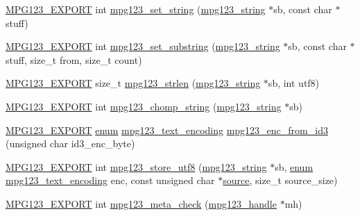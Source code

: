 \begin{DoxyCompactItemize}
\item 
\hyperlink{mpg123_8h_a2ba98cfba3f760879df70e755b2a61cc}{M\+P\+G123\+\_\+\+E\+X\+P\+O\+RT} int \hyperlink{group__mpg123__metadata_ga96e9070d26d63c02c3f22caa0d339f26}{mpg123\+\_\+set\+\_\+string} (\hyperlink{structmpg123__string}{mpg123\+\_\+string} $\ast$sb, const char $\ast$stuff)
\item 
\hyperlink{mpg123_8h_a2ba98cfba3f760879df70e755b2a61cc}{M\+P\+G123\+\_\+\+E\+X\+P\+O\+RT} int \hyperlink{group__mpg123__metadata_ga37b68d834755647a4ef227b0dd4b5c2a}{mpg123\+\_\+set\+\_\+substring} (\hyperlink{structmpg123__string}{mpg123\+\_\+string} $\ast$sb, const char $\ast$stuff, size\+\_\+t from, size\+\_\+t count)
\item 
\hyperlink{mpg123_8h_a2ba98cfba3f760879df70e755b2a61cc}{M\+P\+G123\+\_\+\+E\+X\+P\+O\+RT} size\+\_\+t \hyperlink{group__mpg123__metadata_ga556c8eb6c2ee4b88d744dcf20dffa83b}{mpg123\+\_\+strlen} (\hyperlink{structmpg123__string}{mpg123\+\_\+string} $\ast$sb, int utf8)
\item 
\hyperlink{mpg123_8h_a2ba98cfba3f760879df70e755b2a61cc}{M\+P\+G123\+\_\+\+E\+X\+P\+O\+RT} int \hyperlink{group__mpg123__metadata_gad149639f724347c8c420c8551ea3d4c2}{mpg123\+\_\+chomp\+\_\+string} (\hyperlink{structmpg123__string}{mpg123\+\_\+string} $\ast$sb)
\item 
\hyperlink{mpg123_8h_a2ba98cfba3f760879df70e755b2a61cc}{M\+P\+G123\+\_\+\+E\+X\+P\+O\+RT} \hyperlink{interfaceenum}{enum} \hyperlink{group__mpg123__metadata_ga489b4cd5fb8d1d826e38b09bed9294ce}{mpg123\+\_\+text\+\_\+encoding} \hyperlink{group__mpg123__metadata_gabd394947d8cca46e49a0e07926bb2369}{mpg123\+\_\+enc\+\_\+from\+\_\+id3} (unsigned char id3\+\_\+enc\+\_\+byte)
\item 
\hyperlink{mpg123_8h_a2ba98cfba3f760879df70e755b2a61cc}{M\+P\+G123\+\_\+\+E\+X\+P\+O\+RT} int \hyperlink{group__mpg123__metadata_ga5800cb8b5886969982a695258d80f342}{mpg123\+\_\+store\+\_\+utf8} (\hyperlink{structmpg123__string}{mpg123\+\_\+string} $\ast$sb, \hyperlink{interfaceenum}{enum} \hyperlink{group__mpg123__metadata_ga489b4cd5fb8d1d826e38b09bed9294ce}{mpg123\+\_\+text\+\_\+encoding} enc, const unsigned char $\ast$\hyperlink{structsource}{source}, size\+\_\+t source\+\_\+size)
\item 
\hyperlink{mpg123_8h_a2ba98cfba3f760879df70e755b2a61cc}{M\+P\+G123\+\_\+\+E\+X\+P\+O\+RT} int \hyperlink{group__mpg123__metadata_ga1cd6279a1273f63eb8dcc8a554d815bb}{mpg123\+\_\+meta\+\_\+check} (\hyperlink{group__mpg123__init_ga6728e2839a395f3a07d4514da659faca}{mpg123\+\_\+handle} $\ast$mh)

\end{DoxyCompactItemize}
